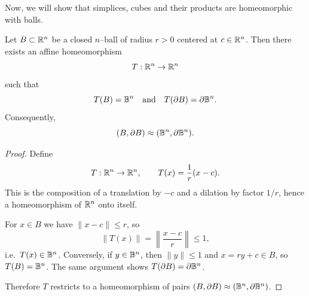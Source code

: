 Now, we will show that simplices, cubes and their products are homeomorphic with balls.

\begin{lemma}[Normalization]\label{lem:normalization}
    Let $B\subset \mathbb{R}^n$ be a closed $n$--ball of radius $r>0$ centered at $c\in\mathbb{R}^n$. 
    Then there exists an affine homeomorphism 
    \[
        T:\mathbb{R}^n \to \mathbb{R}^n
    \]
    such that 
    \[
        T(B) = \mathbb{B}^n \quad \text{and} \quad T(\partial B) = \partial \mathbb{B}^n.
    \]
    Consequently, 
    \[
        (B,\partial B)\approx (\mathbb{B}^n,\partial \mathbb{B}^n).
    \]
\end{lemma}

\begin{proof}
    Define 
    \[
        T:\mathbb{R}^n \to \mathbb{R}^n, \qquad T(x) = \dfrac{1}{r}(x-c).
    \]
    This is the composition of a translation by $-c$ and a dilation by factor $1/r$, 
    hence a homeomorphism of $\mathbb{R}^n$ onto itself. 

    For $x\in B$ we have $\|x-c\|\le r$, so 
    \[
        \|T(x)\| = \left\|\dfrac{x-c}{r}\right\|\le 1,
    \]
    i.e.\ $T(x)\in \mathbb{B}^n$. Conversely, if $y\in \mathbb{B}^n$, then $\|y\|\le 1$ and 
    $x = r y + c\in B$, so $T(B)=\mathbb{B}^n$. The same argument shows 
    $T(\partial B)=\partial \mathbb{B}^n$. 

    Therefore $T$ restricts to a homeomorphism of pairs 
    $(B,\partial B)\approx (\mathbb{B}^n,\partial \mathbb{B}^n)$.
\end{proof}

